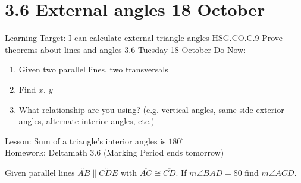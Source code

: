 \section{3.6 External angles \hfill 18 October}
\begin{frame}{Learning Target: I can calculate external triangle angles}
  {HSG.CO.C.9 Prove theorems about lines and angles  \hfill \alert{3.6 Tuesday 18 October}}
  Do Now: 
  \begin{multicols}{2}
    \begin{enumerate}
      \item Given two parallel lines, two transversals
      \item Find $x$, $y$
      \item What relationship are you using? (e.g. vertical angles, same-side exterior angles, alternate interior angles, etc.)
    \end{enumerate}
  \end{multicols}
  Lesson: Sum of a triangle's interior angles is $180^\circ$ \\[0.25cm]
  Homework: Deltamath 3.6 (Marking Period ends tomorrow)
\end{frame}


\begin{frame}
    Given parallel lines $\overleftrightarrow{AB} \parallel \overleftrightarrow{CDE}$ with $\overline{AC} \cong \overline{CD}$. If $m\angle BAD=80$ find $m\angle ACD$.
  \begin{flushright}
  \end{flushright} \vspace{1cm}
  \end{frame}

